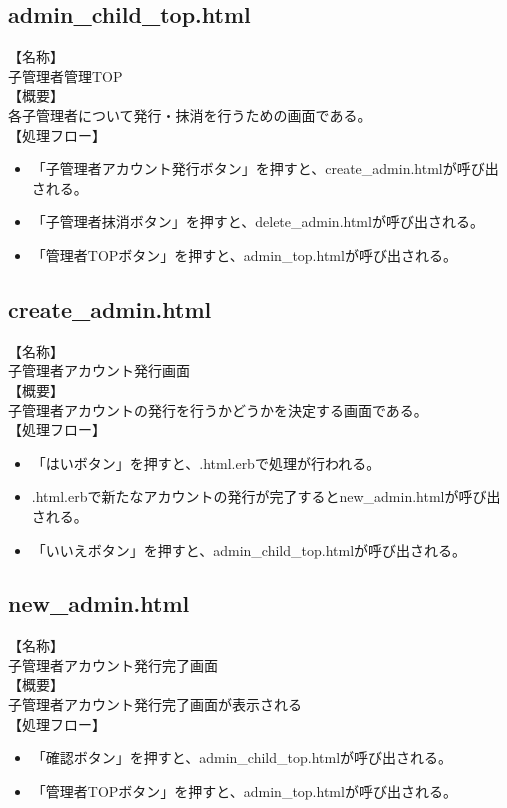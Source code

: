 \documentclass[a4j]{jarticle}
\begin{document}
\subsection{admin\_child\_top.html}
\noindent
【名称】\\
子管理者管理TOP\\
【概要】\\
各子管理者について発行・抹消を行うための画面である。\\
【処理フロー】
\begin{itemize}
\item 「子管理者アカウント発行ボタン」を押すと、create\_admin.htmlが呼び出される。
\item 「子管理者抹消ボタン」を押すと、delete\_admin.htmlが呼び出される。
\item 「管理者TOPボタン」を押すと、admin\_top.htmlが呼び出される。
\end{itemize}

\subsection{create\_admin.html}
\noindent
【名称】\\
子管理者アカウント発行画面\\
【概要】\\
子管理者アカウントの発行を行うかどうかを決定する画面である。\\
【処理フロー】
\begin{itemize}
\item 「はいボタン」を押すと、.html.erbで処理が行われる。
\item .html.erbで新たなアカウントの発行が完了するとnew\_admin.htmlが呼び出される。
\item 「いいえボタン」を押すと、admin\_child\_top.htmlが呼び出される。
\end{itemize}

\subsection{new\_admin.html}
\noindent
【名称】\\
子管理者アカウント発行完了画面\\
【概要】\\
子管理者アカウント発行完了画面が表示される\\
【処理フロー】
\begin{itemize}
\item 「確認ボタン」を押すと、admin\_child\_top.htmlが呼び出される。
\item 「管理者TOPボタン」を押すと、admin\_top.htmlが呼び出される。
\end{itemize}
\end{document}

